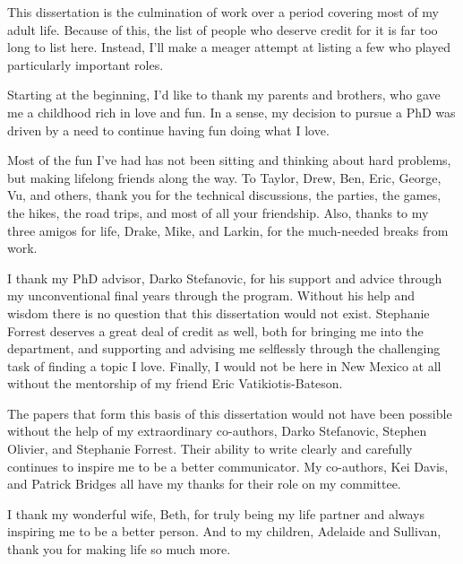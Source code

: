 \documentclass[botnum, fleqn]{unmeethesis}
\begin{document}
\begin{acknowledgments}
  \vspace{1.1in}
  This dissertation is the culmination of work over a period covering most of my
  adult life. Because of this, the list of people who deserve credit for it is
  far too long to list here. Instead, I'll make a meager attempt at listing a
  few who played particularly important roles. 

  Starting at the beginning, I'd like to thank my parents and brothers, who gave
  me a childhood rich in love and fun. In a sense, my decision to pursue a PhD
  was driven by a need to continue having fun doing what I love.  

  Most of the fun I've had has not been sitting and thinking about hard
  problems, but making lifelong friends along the way. To Taylor, Drew, Ben,
  Eric, George, Vu, and others, thank you for the technical discussions, the
  parties, the games, the hikes, the road trips, and most of all your
  friendship. Also, thanks to my three amigos for life, Drake, Mike, and Larkin,
  for the much-needed breaks from work. 

  I thank my PhD advisor, Darko Stefanovic, for his support and advice through
  my unconventional final years through the program. Without his help and
  wisdom there is no question that this dissertation would not exist. Stephanie
  Forrest deserves a great deal of credit as well, both for bringing me into the
  department, and supporting and advising me selflessly through the challenging
  task of finding a topic I love. Finally, I would not be here in New Mexico at
  all without the mentorship of my friend Eric Vatikiotis-Bateson.

  The papers that form this basis of this dissertation would not have been
  possible without the help of my extraordinary co-authors, Darko Stefanovic,
  Stephen Olivier, and Stephanie Forrest. Their ability to write clearly and
  carefully continues to inspire me to be a better communicator. My co-authors,
  Kei Davis, and Patrick Bridges all have my thanks for their role on my
  committee.

  I thank my wonderful wife, Beth, for truly being my life partner and always
  inspiring me to be a better person. And to my children, Adelaide and Sullivan,
  thank you for making life so much more.
\end{acknowledgments}

\maketitleabstract %
\end{document}
